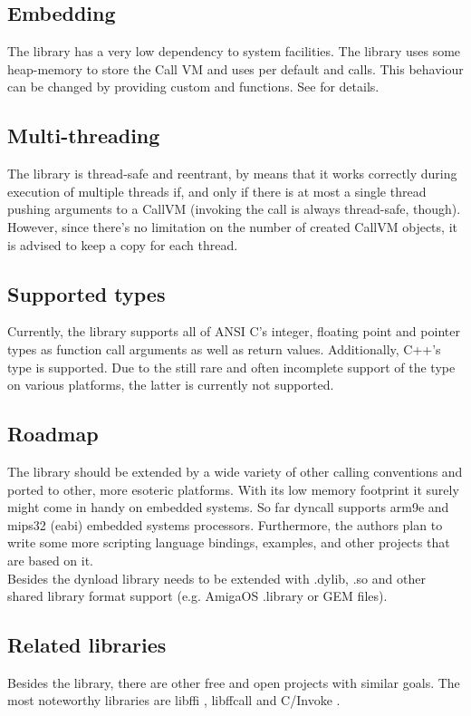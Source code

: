\subsection{Embedding}

The  library has a very low dependency to system facilities.
The library uses some heap-memory to store the Call VM and uses per default
 and  calls. This behaviour can be changed by 
providing custom  and  functions.
See  for details.


\subsection{Multi-threading}

The  library is thread-safe and reentrant, by means that it
works correctly during execution of multiple threads if, and only if there is
at most a single thread pushing arguments to a CallVM (invoking the call is
always thread-safe, though). However, since there's no limitation on the
number of created CallVM objects, it is advised to keep a copy for each
thread.


\subsection{Supported types}

Currently, the  library supports all of ANSI C's integer,
floating point and pointer types as function call arguments as well as return
values. Additionally, C++'s  type is supported. Due to the still
rare and often incomplete support of the  type on various
platforms, the latter is currently not supported.


\subsection{Roadmap}

The  library should be extended by a wide variety of other
calling conventions and ported to other, more esoteric platforms. With its low
memory footprint it surely might come in handy on embedded systems. So far
dyncall supports arm9e and mips32 (eabi) embedded systems processors.
Furthermore, the authors plan to write some more scripting language bindings,
examples, and other projects that are based on it.\\
Besides  the dynload library needs to be extended with
.dylib, .so and other shared library format support (e.g. AmigaOS .library or
GEM \cite{.ldg} files).


\subsection{Related libraries}

Besides the  library, there are other free and open projects
with similar goals. The most noteworthy libraries are libffi \cite{libffi},
libffcall \cite{libffcall} and C/Invoke \cite{cinvoke}.
